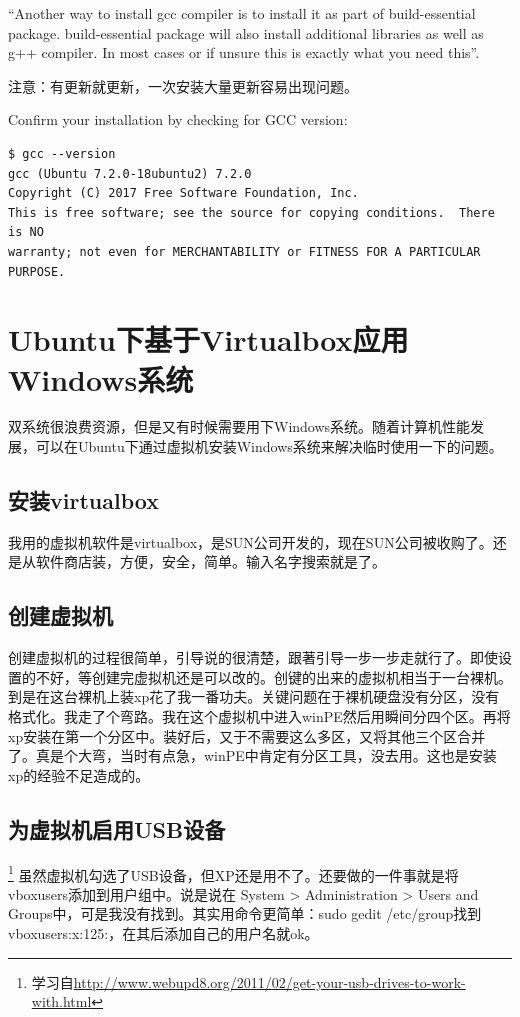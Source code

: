 “Another way to install gcc compiler is to install it as part of build-essential package. build-essential package will also install additional libraries as well as g++ compiler. In most cases or if unsure this is exactly what you need this”.

注意：有更新就更新，一次安装大量更新容易出现问题。

Confirm your installation by checking for GCC version:

\begin{verbatim}
$ gcc --version
gcc (Ubuntu 7.2.0-18ubuntu2) 7.2.0
Copyright (C) 2017 Free Software Foundation, Inc.
This is free software; see the source for copying conditions.  There is NO
warranty; not even for MERCHANTABILITY or FITNESS FOR A PARTICULAR PURPOSE.
\end{verbatim}




\section{Ubuntu下基于Virtualbox应用Windows系统}
双系统很浪费资源，但是又有时候需要用下Windows系统。随着计算机性能发展，可以在Ubuntu下通过虚拟机安装Windows系统来解决临时使用一下的问题。

\subsection{安装virtualbox}
    我用的虚拟机软件是virtualbox，是SUN公司开发的，现在SUN公司被收购了。还是从软件商店装，方便，安全，简单。输入名字搜索就是了。
\subsection{创建虚拟机}
    创建虚拟机的过程很简单，引导说的很清楚，跟著引导一步一步走就行了。即使设置的不好，等创建完虚拟机还是可以改的。创键的出来的虚拟机相当于一台裸机。到是在这台裸机上装xp花了我一番功夫。关键问题在于裸机硬盘没有分区，没有格式化。我走了个弯路。我在这个虚拟机中进入winPE然后用瞬间分四个区。再将xp安装在第一个分区中。装好后，又于不需要这么多区，又将其他三个区合并了。真是个大弯，当时有点急，winPE中肯定有分区工具，没去用。这也是安装xp的经验不足造成的。


\subsection{为虚拟机启用USB设备}
 \footnote{学习自\url{http://www.webupd8.org/2011/02/get-your-usb-drives-to-work-with.html}}
    虽然虚拟机勾选了USB设备，但XP还是用不了。还要做的一件事就是将 vboxusers添加到用户组中。说是说在 System > Administration > Users and Groups中，可是我没有找到。其实用命令更简单：sudo gedit /etc/group找到vboxusers:x:125:，在其后添加自己的用户名就ok。


